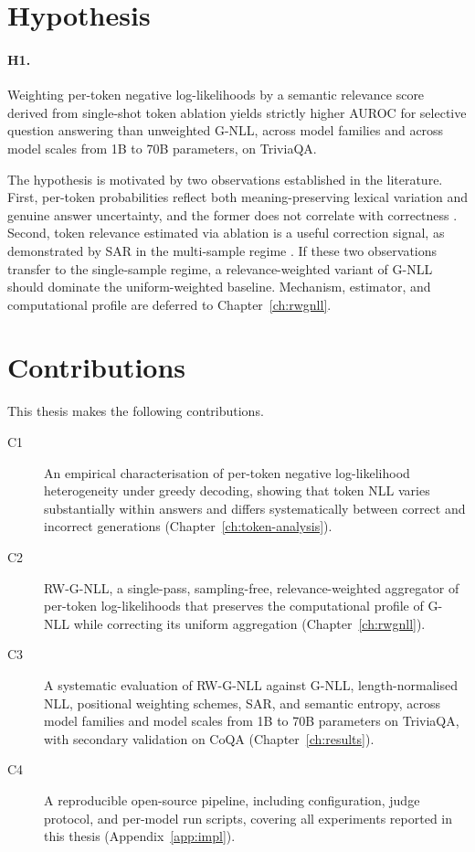 \documentclass[a4paper,oneside,10pt,ngerman,english]{scrbook}
\begin{document}
\section{Hypothesis}
\label{sec:hypothesis}
\paragraph{H1.}
Weighting per-token negative log-likelihoods by a semantic relevance score
derived from single-shot token ablation yields strictly higher AUROC for
selective question answering than unweighted G-NLL, across model families and
across model scales from 1B to 70B parameters, on TriviaQA.

\noindent
The hypothesis is motivated by two observations established in the
literature. First, per-token probabilities reflect both meaning-preserving
lexical variation and genuine answer uncertainty, and the former does not
correlate with correctness \cite{kuhn2023semantic}. Second, token relevance
estimated via ablation is a useful correction signal, as demonstrated by
SAR in the multi-sample regime \cite{duan2024sar}. If these two observations
transfer to the single-sample regime, a relevance-weighted variant of G-NLL
should dominate the uniform-weighted baseline. Mechanism, estimator, and
computational profile are deferred to Chapter~\ref{ch:rwgnll}.


\section{Contributions}
\label{sec:contributions}
This thesis makes the following contributions.
\begin{description}
    \item[C1] An empirical characterisation of per-token negative
    log-likelihood heterogeneity under greedy decoding, showing that token
    NLL varies substantially within answers and differs systematically
    between correct and incorrect generations (Chapter~\ref{ch:token-analysis}).
    \item[C2] \textsc{RW-G-NLL}, a single-pass, sampling-free,
    relevance-weighted aggregator of per-token log-likelihoods that preserves
    the computational profile of G-NLL while correcting its uniform
    aggregation (Chapter~\ref{ch:rwgnll}).
    \item[C3] A systematic evaluation of RW-G-NLL against G-NLL,
    length-normalised NLL, positional weighting schemes, SAR, and semantic
    entropy, across model families and model scales from 1B to 70B
    parameters on TriviaQA, with secondary validation on CoQA
    (Chapter~\ref{ch:results}).
    \item[C4] A reproducible open-source pipeline, including configuration,
    judge protocol, and per-model run scripts, covering all experiments
    reported in this thesis (Appendix~\ref{app:impl}).
\end{description}
\end{document}
